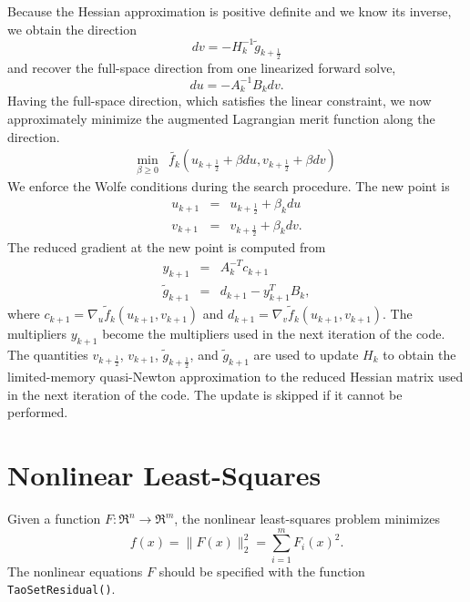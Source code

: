Because the Hessian approximation is positive definite and we know its
inverse, we obtain the direction
\[
  dv = -H_k^{-1} \tilde{g}_{k+\frac{1}{2}}
\]
and recover the full-space direction from one linearized forward solve,
\[
  du = -A_k^{-1} B_k dv.
\]
Having the full-space direction, which satisfies the linear constraint, 
we now approximately minimize the augmented Lagrangian merit function 
along the direction.
\[
\begin{array}{lcl}
\displaystyle \min_{\beta \geq 0} & \tilde{f_k}(u_{k+\frac{1}{2}} + \beta du, v_{k+\frac{1}{2}} + \beta dv)
\end{array}
\]
We enforce the Wolfe conditions during the search procedure.  The new point
is
\[
\begin{array}{lcl}
u_{k+1} & = & u_{k+\frac{1}{2}} + \beta_k du \\
v_{k+1} & = & v_{k+\frac{1}{2}} + \beta_k dv.
\end{array}
\]
The reduced gradient at the new point is computed from
\[
\begin{array}{lcl}
y_{k+1} & = & A_k^{-T}c_{k+1} \\
\tilde{g}_{k+1} & = & d_{k+1} - y_{k+1}^T B_k,
\end{array}
\]
where $c_{k+1} = \nabla_u \tilde{f}_k (u_{k+1},v_{k+1})$ and
$d_{k+1} = \nabla_v \tilde{f}_k (u_{k+1},v_{k+1})$.  The
multipliers $y_{k+1}$ become the multipliers used in the
next iteration of the code.  The quantities $v_{k+\frac{1}{2}}$,
$v_{k+1}$, $\tilde{g}_{k+\frac{1}{2}}$, and $\tilde{g}_{k+1}$ are
used to update $H_k$ to obtain the limited-memory quasi-Newton
approximation to the reduced Hessian matrix used in the next
iteration of the code.  The update is skipped if it cannot be
performed.

\section{Nonlinear Least-Squares}
\label{sec:leastsquares}
Given a function $F: \Re^n \to \Re^m$, the nonlinear least-squares 
problem minimizes 
\begin{equation} 
 f(x)= \| F(x) \|_2^2 = \sum_{i=1}^m F_i(x)^2.
 \label{eq:nlsf}
\end{equation}
The nonlinear equations $F$ should be specified with the function
{\tt TaoSetResidual()}. 

\begin{comment}
Most solvers also require the Jacobian of this function.  
The routine that evaluates this matrix should be set
using the command {\tt Tao\-Set\-Jacobian\-Routine()}.

Using the constraint data provided by the user, the nonlinear
least squares solver formulates a minimization problem, and
solves the minimization problem using another TAO solver.  
A nonlinear least squares application should be solved with
the method \texttt{tao\_pounders} or \texttt{tao\_lm}.
\textbf{***** Jason, check the lm above. It would be great to include it
but otherwise say that we only have methods that do not use the Jacobian
and that if they have a Jacobian, they should use something else/the
next/beta version.}
\end{comment}

